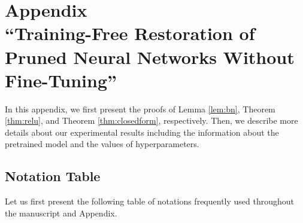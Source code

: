 \onecolumn

\section*{Appendix \\``Training-Free Restoration of Pruned Neural Networks Without Fine-Tuning''} \label{sec:supp}

\vspace{10mm}

\setcounter{table}{0}
\setcounter{figure}{0}

\renewcommand{\thetable}{A\arabic{table}}  
\renewcommand{\thefigure}{A\arabic{figure}}
\renewcommand{\thesubsection}{A\arabic{subsection}}

In this appendix, we first present the proofs of Lemma \ref{lem:bn}, Theorem \ref{thm:relu}, and Theorem \ref{thm:closedform}, respectively. Then, we describe more details about our experimental results including the information about the pretrained model and the values of hyperparameters.

\subsection{Notation Table}
Let us first present the following table of notations frequently used throughout the manuscript and Appendix.

